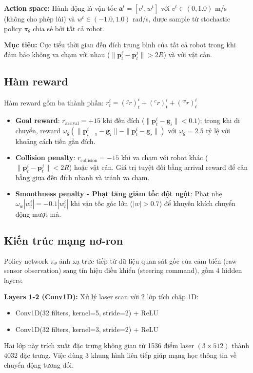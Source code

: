 \textbf{Action space:} Hành động là vận tốc $\mathbf{a}^t = [v^t, w^t]$ với $v^t \in (0, 1.0)$ m/s (không cho phép lùi) và $w^t \in (-1.0, 1.0)$ rad/s, được sample từ stochastic policy $\pi_\theta$ chia sẻ bởi tất cả robot.

\textbf{Mục tiêu:} Cực tiểu thời gian đến đích trung bình của tất cả robot trong khi đảm bảo không va chạm với nhau ($\|\mathbf{p}_t^i - \mathbf{p}_t^j\| > 2R$) và với vật cản.

\subsection{Hàm reward}
\label{subsec:long_reward}

Hàm reward gồm ba thành phần: $r_t^i = (^g r)_t^i + (^c r)_t^i + (^w r)_t^i$

\begin{itemize}
\item \textbf{Goal reward}: $r_{\text{arrival}} = +15$ khi đến đích ($\|\mathbf{p}_t^i - \mathbf{g}_i\| < 0.1$); trong khi di chuyển, reward $\omega_g (\|\mathbf{p}_{t-1}^i - \mathbf{g}_i\| - \|\mathbf{p}_t^i - \mathbf{g}_i\|)$ với $\omega_g = 2.5$ tỷ lệ với khoảng cách tiến gần đích.

\item \textbf{Collision penalty}: $r_{\text{collision}} = -15$ khi va chạm với robot khác ($\|\mathbf{p}_t^i - \mathbf{p}_t^j\| < 2R$) hoặc vật cản. Giá trị tuyệt đối bằng arrival reward để cân bằng giữa đến đích nhanh và tránh va chạm.

\item \textbf{Smoothness penalty - Phạt tăng giảm tốc đột ngột}: Phạt nhẹ $\omega_w |w_t^i| = -0.1 |w_t^i|$ khi vận tốc góc lớn ($|w| > 0.7$) để khuyến khích chuyển động mượt mà.
\end{itemize}

\subsection{Kiến trúc mạng nơ-ron}
\label{subsec:long_architecture}

Policy network $\pi_\theta$ ánh xạ trực tiếp từ dữ liệu quan sát gốc của cảm biến (raw sensor observation) sang tín hiệu điều khiển (steering command), gồm 4 hidden layers:

\textbf{Layers 1-2 (Conv1D):} Xử lý laser scan với 2 lớp tích chập 1D:
\begin{itemize}
\item Conv1D(32 filters, kernel=5, stride=2) + ReLU
\item Conv1D(32 filters, kernel=3, stride=2) + ReLU
\end{itemize}
Hai lớp này trích xuất đặc trưng không gian từ 1536 điểm laser $(3 \times 512)$ thành 4032 đặc trưng. Việc dùng 3 khung hình liên tiếp giúp mạng học thông tin về chuyển động tương đối.

